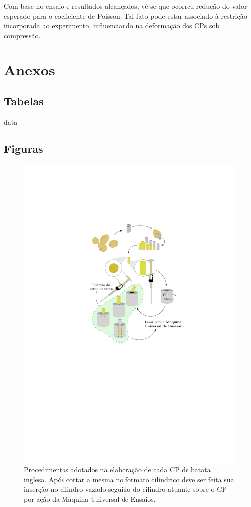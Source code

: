 \documentclass[a4paper, 12pt, brazilian]{article}
\begin{document}
	Com base no ensaio e resultados alcançados, vê-se que ocorreu redução do valor esperado para o coeficiente de Poisson. Tal fato pode estar associado à restrição incorporada ao experimento, influenciando na deformação dos CPs sob compressão.
	\section{Anexos}
	
	\subsection{Tabelas}
	
	{data}
	
	\subsection{Figuras}
	
	\begin{figure}[H]
		\centering
		\includegraphics[scale=1.1]{images/diagram}
		\caption{Procedimentos adotados na elaboração de cada CP de batata inglesa. Após cortar a mesma no formato cilíndrico deve ser feita sua inserção no cilindro vazado seguido do cilindro atuante sobre o CP por ação da Máquina Universal de Ensaios.}
		\label{fig:diagram}
	\end{figure}
\end{document}
